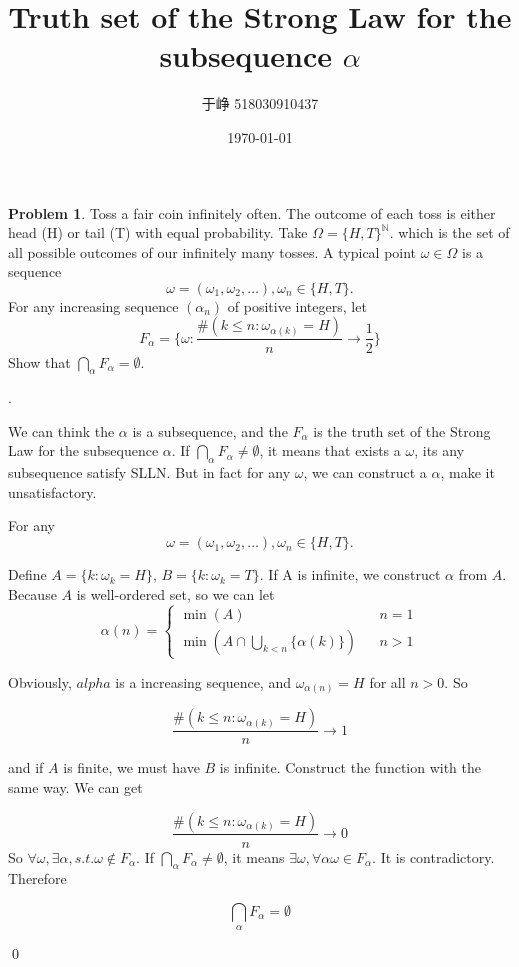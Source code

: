 \documentclass[UTF8]{ctexart}
\newenvironment{sol}
  {\par\vspace{3mm}\noindent{\it Solution}.}
  {\qed \\ \medskip}
\theoremstyle{definition}
\newtheorem{problem}{Problem}
\begin{document}
\title{Truth set of the Strong Law for the subsequence $\alpha$}
\author{于峥 518030910437}
\date{\today}
\maketitle

\begin{problem}
    Toss a fair coin infinitely often. The outcome of each toss
is either head (H) or tail (T) with equal probability. Take $\Omega = \{H,T\}^{\mathbb{N}}$.
which is the set of all possible outcomes of our infinitely many tosses.
A typical point $\omega \in \Omega$ is a sequence
$$
    \omega = (\omega_1, \omega_2, \dots), \omega_n \in \{ H,T\}.
$$
For any increasing sequence $(\alpha_n)$ of positive integers, let
$$
    F_{\alpha} = \{\omega : \frac {\#(k \leq n : \omega_{\alpha(k)}=H)} {n} \rightarrow \frac 1 2 \}
$$
Show that $\bigcap_\alpha F_\alpha = \emptyset$. \newline

\begin{sol}
    

We can think the $\alpha$ is a subsequence, and the $F_\alpha$ is the truth 
set of the Strong Law for the subsequence $\alpha$. 
If $\bigcap_\alpha F_\alpha \not= \emptyset$, it means that exists a $\omega$, its any subsequence satisfy
SLLN. But in fact for any $\omega$, we can construct a $\alpha$, make it unsatisfactory. 

For any 
$$
    \omega = (\omega_1, \omega_2, \dots), \omega_n \in \{ H,T\}.
$$

Define $A = \{ k : \omega_k = H \}$, $B = \{ k : \omega_k = T \}$. If A is 
infinite, we construct $\alpha$ from $A$. Because $A$ is well-ordered set, so we can let
 \begin{equation*}
    \alpha(n) = \left\{
    \begin{aligned}
        \min (A) && n = 1 \\
        \min(A \cap \bigcup_{k<n}\{\alpha(k)\} ) && n > 1
    \end{aligned}
    \right.
 \end{equation*}

Obviously, $alpha$ is a increasing sequence, and $\omega_{\alpha(n)} = H$ for 
all $n > 0$. So 

$$
    \frac {\#(k \leq n : \omega_{\alpha(k)}=H)} {n} \rightarrow 1
$$

and if $A$ is finite, we must have $B$ is infinite. Construct the function with the same way. 
We can get

$$
    \frac {\#(k \leq n : \omega_{\alpha(k)}=H)} {n} \rightarrow 0
$$
So $\forall \omega, \exists \alpha, s.t. \omega \not\in F_\alpha$. If $\bigcap_\alpha F_\alpha \not= \emptyset$, 
it means $\exists \omega, \forall \alpha \omega \in F_\alpha$. It is contradictory. Therefore

$$
\bigcap_\alpha F_\alpha = \emptyset
$$

\end{sol}
\end{problem}
\end{document}
